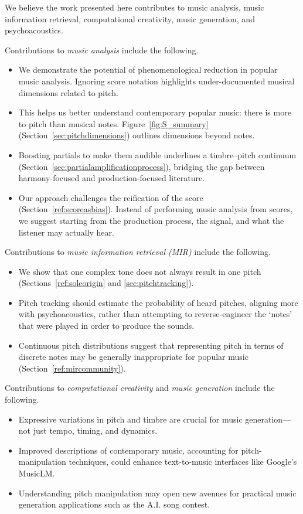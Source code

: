 \documentclass{article}
\begin{document}
We believe the work presented here contributes to music analysis, music information retrieval, computational creativity, music generation, and psychoacoustics.

Contributions to \emph{music analysis} include the following.

\begin{itemize}[noitemsep]
    \item We demonstrate the potential of phenomenological reduction in popular music analysis. Ignoring score notation highlights under-documented musical dimensions related to pitch.
    \item This helps us better understand contemporary popular music: there is more to pitch than musical notes. Figure~\ref{fig:S_summary} (Section~\ref{sec:pitchdimensions}) outlines dimensions beyond notes.
    \item Boosting partials to make them audible underlines a timbre--pitch continuum (Section~\ref{sec:partialamplificationprocess}), bridging the gap between harmony-focused and production-focused literature.
    \item Our approach challenges the reification of the score (Section~\ref{ref:scoreasbias}). Instead of performing music analysis from scores, we suggest starting from the production process, the signal, and what the listener may actually hear.
\end{itemize}


Contributions to \emph{music information retrieval (MIR)} include the following.

\begin{itemize}[noitemsep]
    \item We show that one complex tone does not always result in one pitch (Sections~\ref{ref:soleorigin} and \ref{sec:pitchtracking}).
    \item Pitch tracking should estimate the probability of heard pitches, aligning more with psychoacoustics, rather than attempting to reverse-engineer the `notes' that were played in order to produce the sounds.
    \item Continuous pitch distributions suggest that representing pitch in terms of discrete notes may be generally inappropriate for popular music (Section~\ref{ref:mircommunity}).
\end{itemize}

Contributions to \emph{computational creativity} and \emph{music generation} include the following.

\begin{itemize}[noitemsep]
    \item Expressive variations in pitch and timbre are crucial for music generation---not just tempo, timing, and dynamics.
    \item Improved descriptions of contemporary music, accounting for pitch-manipulation techniques, could enhance text-to-music interfaces like Google's MusicLM.
    \item Understanding pitch manipulation may open new avenues for practical music generation applications such as the A.I. song contest.
\end{itemize}
\end{document}

